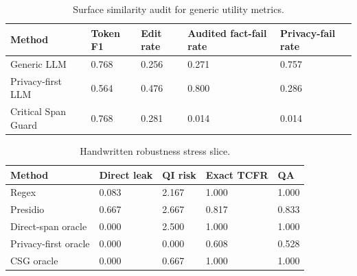 \begin{table}[t]
\centering
\begin{tabular}{lllll}
\toprule
Method & Token F1 & Edit rate & Audited fact-fail rate & Privacy-fail rate \\
\midrule
Generic LLM & 0.768 & 0.256 & 0.271 & 0.757 \\
Privacy-first LLM & 0.564 & 0.476 & 0.800 & 0.286 \\
Critical Span Guard & 0.768 & 0.281 & 0.014 & 0.014 \\
\bottomrule
\end{tabular}
\caption{Surface similarity audit for generic utility metrics.}
\end{table}

\begin{table}[t]
\centering
\begin{tabular}{lllll}
\toprule
Method & Direct leak & QI risk & Exact TCFR & QA \\
\midrule
Regex & 0.083 & 2.167 & 1.000 & 1.000 \\
Presidio & 0.667 & 2.667 & 0.817 & 0.833 \\
Direct-span oracle & 0.000 & 2.500 & 1.000 & 1.000 \\
Privacy-first oracle & 0.000 & 0.000 & 0.608 & 0.528 \\
CSG oracle & 0.000 & 0.667 & 1.000 & 1.000 \\
\bottomrule
\end{tabular}
\caption{Handwritten robustness stress slice.}
\end{table}
